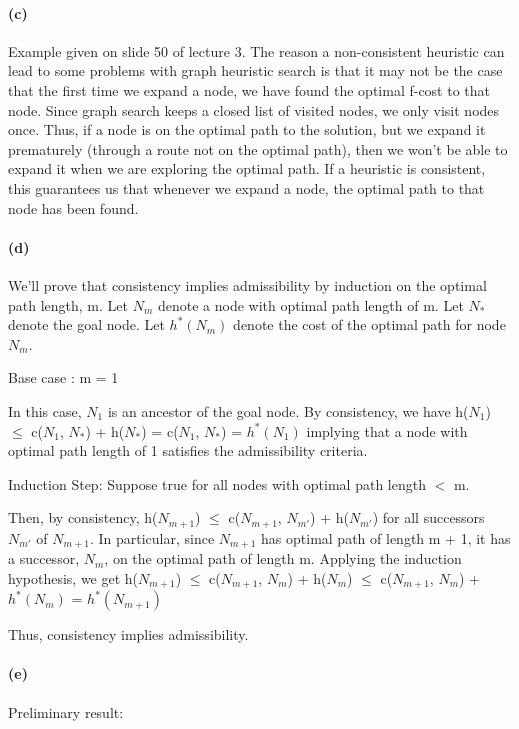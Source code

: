 \documentclass[11pt,a4paper]{article}
\begin{document}
\paragraph*{(c)}
Example given on slide 50 of lecture 3. The reason a non-consistent heuristic can lead to some problems with graph heuristic search is that it may not be the case that the first time we expand a node, we have found the optimal f-cost to that node. Since graph search keeps a closed list of visited nodes, we only visit nodes once. Thus, if a node is on the optimal path to the solution, but we expand it prematurely (through a route not on the optimal path), then we won't be able to expand it when we are exploring the optimal path. If a heuristic is consistent, this guarantees us that whenever we expand a node, the optimal path to that node has been found. 

\paragraph*{(d)}
We'll prove that consistency implies admissibility by induction on the optimal path length, m. Let $N_{m}$ denote a node with optimal path length of m. Let $N_{*}$ denote the goal node. Let $h^{*}(N_{m})$ denote the cost of the optimal path for node $N_{m}$. 

Base case : m = 1

In this case, $N_{1}$ is an ancestor of the goal node. By consistency, we have h($N_{1}$) $\leq$ c($N_{1}$, $N_{*}$) + h($N_{*}$) = c($N_{1}$, $N_{*}$) = $h^{*}(N_{1})$ implying that a node with optimal path length of 1 satisfies the admissibility criteria.

Induction Step: Suppose true for all nodes with optimal path length $<$ m. 

Then, by consistency, h($N_{m+1}$) $\leq$ c($N_{m+1}$, $N_{m'}$) + h($N_{m'}$) for all successors $N_{m'}$ of $N_{m+1}$. In particular, since $N_{m+1}$ has optimal path of length m + 1, it has a successor, $N_{m}$, on the optimal path of length m. Applying the induction hypothesis, we get  h($N_{m+1}$) $\leq$ c($N_{m+1}$, $N_{m}$) + h($N_{m}$) $\leq$ c($N_{m+1}$, $N_{m}$) + $h^{*}(N_{m})$ = $h^{*}(N_{m+1})$ 

Thus, consistency implies admissibility. 

\paragraph*{(e)}
Preliminary result:
\end{document}
